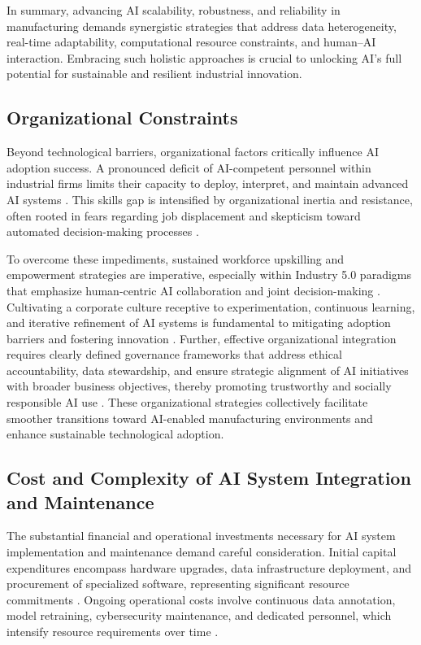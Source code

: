 \documentclass[sigconf]{acmart}
\begin{document}
In summary, advancing AI scalability, robustness, and reliability in manufacturing demands synergistic strategies that address data heterogeneity, real-time adaptability, computational resource constraints, and human–AI interaction. Embracing such holistic approaches is crucial to unlocking AI's full potential for sustainable and resilient industrial innovation.

\subsection{Organizational Constraints}

Beyond technological barriers, organizational factors critically influence AI adoption success. A pronounced deficit of AI-competent personnel within industrial firms limits their capacity to deploy, interpret, and maintain advanced AI systems \cite{ref7,ref26}. This skills gap is intensified by organizational inertia and resistance, often rooted in fears regarding job displacement and skepticism toward automated decision-making processes \cite{ref3,ref26}.

To overcome these impediments, sustained workforce upskilling and empowerment strategies are imperative, especially within Industry 5.0 paradigms that emphasize human-centric AI collaboration and joint decision-making \cite{ref3}. Cultivating a corporate culture receptive to experimentation, continuous learning, and iterative refinement of AI systems is fundamental to mitigating adoption barriers and fostering innovation \cite{ref26,ref38}. Further, effective organizational integration requires clearly defined governance frameworks that address ethical accountability, data stewardship, and ensure strategic alignment of AI initiatives with broader business objectives, thereby promoting trustworthy and socially responsible AI use \cite{ref26}. These organizational strategies collectively facilitate smoother transitions toward AI-enabled manufacturing environments and enhance sustainable technological adoption.

\subsection{Cost and Complexity of AI System Integration and Maintenance}

The substantial financial and operational investments necessary for AI system implementation and maintenance demand careful consideration. Initial capital expenditures encompass hardware upgrades, data infrastructure deployment, and procurement of specialized software, representing significant resource commitments \cite{ref11,ref12,ref35}. Ongoing operational costs involve continuous data annotation, model retraining, cybersecurity maintenance, and dedicated personnel, which intensify resource requirements over time \cite{ref7,ref9,ref20}.
\end{document}
